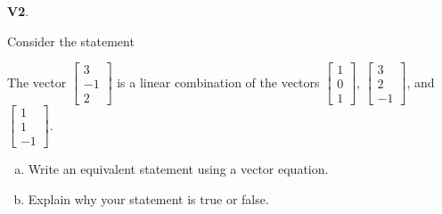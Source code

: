 \documentclass{article}
\newenvironment{problem}[1]
{
  \begin{flushleft}
  \textbf{#1}.
  \ignorespaces
}
{
  \end{flushleft}
}
\begin{document}
\begin{problem}{V2}
Consider the statement
\begin{center}\begin{minipage}{0.8\textwidth}
The vector \(\begin{bmatrix} 3 \\ -1 \\ 2 \end{bmatrix} \) is a linear combination of the vectors
\(\begin{bmatrix} 1 \\ 0 \\ 1 \end{bmatrix} \),
\(\begin{bmatrix} 3 \\ 2 \\ -1 \end{bmatrix} \), and
\(\begin{bmatrix} 1 \\ 1 \\ -1 \end{bmatrix} \).
\end{minipage}\end{center}
\begin{enumerate}[(a)]
\item Write an equivalent statement using a vector equation.
\item Explain why your statement is true or false.
\end{enumerate}
\end{problem}
\end{document}
